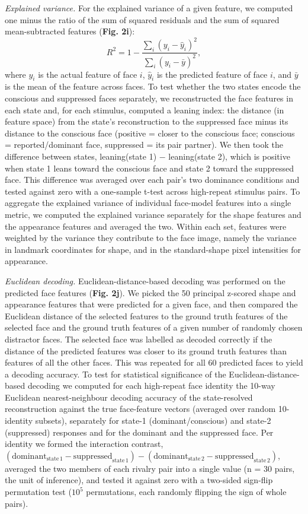 \documentclass{article}
\begin{document}
\textit{Explained variance.} For the explained variance of a given feature, we computed one minus the ratio of the sum of squared residuals and the sum of squared mean-subtracted features (\textbf{Fig. 2i}):
\begin{equation*}
R^2 = 1 - \frac{\sum_i (y_i - \hat{y}_i)^2}{\sum_i (y_i - \bar{y})^2} ,
\end{equation*}
where $y_i$ is the actual feature of face $i$, $\hat{y}_i$ is the predicted feature of face $i$, and $\bar{y}$ is the mean of the feature across faces. To test whether the two states encode the conscious and suppressed faces separately, we reconstructed the face features in each state and, for each stimulus, computed a leaning index: the distance (in feature space) from the state's reconstruction to the suppressed face minus its distance to the conscious face (positive = closer to the conscious face; conscious = reported/dominant face, suppressed = its pair partner). We then took the difference between states, leaning(state 1) $-$ leaning(state 2), which is positive when state 1 leans toward the conscious face and state 2 toward the suppressed face. This difference was averaged over each pair's two dominance conditions and tested against zero with a one-sample t-test across high-repeat stimulus pairs. To aggregate the explained variance of individual face-model features into a single metric, we computed the explained variance separately for the shape features and the appearance features and averaged the two. Within each set, features were weighted by the variance they contribute to the face image, namely the variance in landmark coordinates for shape, and in the standard-shape pixel intensities for appearance.

\textit{Euclidean decoding.} Euclidean-distance-based decoding was performed on the predicted face features (\textbf{Fig. 2j}). We picked the 50 principal z-scored shape and appearance features that were predicted for a given face, and then compared the Euclidean distance of the selected features to the ground truth features of the selected face and the ground truth features of a given number of randomly chosen distractor faces. The selected face was labelled as decoded correctly if the distance of the predicted features was closer to its ground truth features than features of all the other faces. This was repeated for all 60 predicted faces to yield a decoding accuracy. To test for statistical significance of the Euclidean-distance-based decoding we computed for each high-repeat face identity the 10-way Euclidean nearest-neighbour decoding accuracy of the state-resolved reconstruction against the true face-feature vectors (averaged over random 10-identity subsets), separately for state-1 (dominant/conscious) and state-2 (suppressed) responses and for the dominant and the suppressed face. Per identity we formed the interaction contrast, $(\mathrm{dominant}_{\mathrm{state\,1}} - \mathrm{suppressed}_{\mathrm{state\,1}}) - (\mathrm{dominant}_{\mathrm{state\,2}} - \mathrm{suppressed}_{\mathrm{state\,2}})$, averaged the two members of each rivalry pair into a single value (n = 30 pairs, the unit of inference), and tested it against zero with a two-sided sign-flip permutation test ($10^5$ permutations, each randomly flipping the sign of whole pairs).
\end{document}
